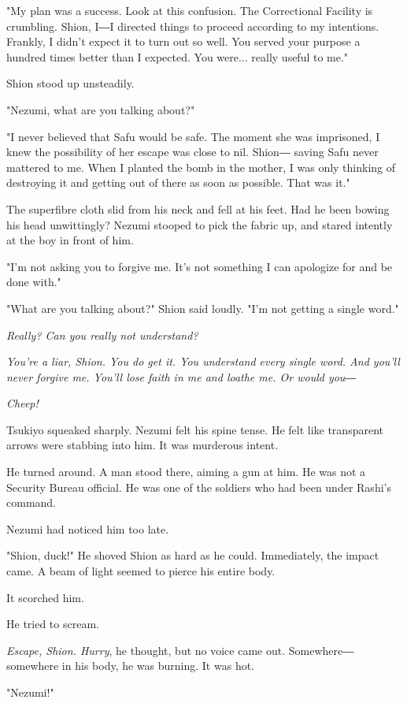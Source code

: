 "My plan was a success. Look at this confusion. The Correctional
Facility is crumbling. Shion, I―I directed things to proceed according
to my intentions. Frankly, I didn't expect it to turn out so well. You
served your purpose a hundred times better than I expected. You were...
really useful to me."

Shion stood up unsteadily.

"Nezumi, what are you talking about?"

"I never believed that Safu would be safe. The moment she was
imprisoned, I knew the possibility of her escape was close to nil.
Shion― saving Safu never mattered to me. When I planted the bomb in the
mother, I was only thinking of destroying it and getting out of there as
soon as possible. That was it."

The superfibre cloth slid from his neck and fell at his feet. Had he
been bowing his head unwittingly? Nezumi stooped to pick the fabric up,
and stared intently at the boy in front of him.

"I'm not asking you to forgive me. It's not something I can apologize
for and be done with."

"What are you talking about?" Shion said loudly. "I'm not getting a
single word."

\emph{Really? Can you really not understand?}

\emph{You're a liar, Shion. You do get it. You understand every single word.
	And you'll never forgive me. You'll lose faith in me and loathe me. Or
	would you―}

\emph{Cheep!}

Tsukiyo squeaked sharply. Nezumi felt his spine tense. He felt like
transparent arrows were stabbing into him. It was murderous intent.

He turned around. A man stood there, aiming a gun at him. He was not a
Security Bureau official. He was one of the soldiers who had been under
Rashi's command.

Nezumi had noticed him too late.

"Shion, duck!" He shoved Shion as hard as he could. Immediately, the
impact came. A beam of light seemed to pierce his entire body.

It scorched him.

He tried to scream.

\emph{Escape, Shion. Hurry}, he thought, but no voice came out. Somewhere―
somewhere in his body, he was burning. It was hot.

"Nezumi!"

